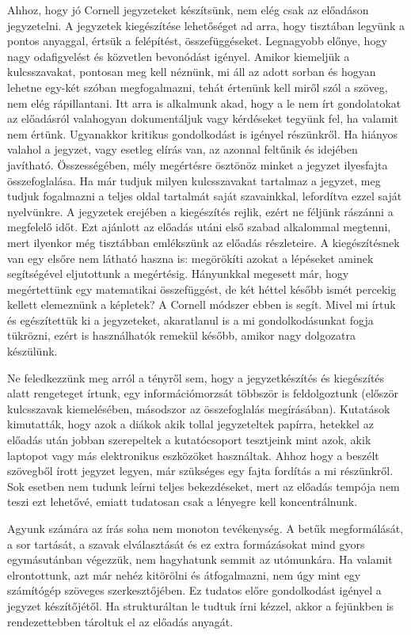 \documentclass[../Main.tex]{subfiles}
\begin{document}
Ahhoz, hogy jó Cornell jegyzeteket készítsünk, nem elég csak az előadáson jegyzetelni.
A jegyzetek kiegészítése lehetőséget ad arra, hogy tisztában legyünk a pontos anyaggal,
értsük a felépítést, összefüggéseket. Legnagyobb előnye, hogy nagy odafigyelést és
közvetlen bevonódást igényel. Amikor kiemeljük a kulcsszavakat, pontosan meg kell
néznünk, mi áll az adott sorban és hogyan lehetne egy-két szóban megfogalmazni, tehát
értenünk kell miről szól a szöveg, nem elég rápillantani. Itt arra is alkalmunk akad, hogy a
le nem írt gondolatokat az előadásról valahogyan dokumentáljuk vagy kérdéseket tegyünk
fel, ha valamit nem értünk. Ugyanakkor kritikus gondolkodást is igényel részünkről. Ha
hiányos valahol a jegyzet, vagy esetleg elírás van, az azonnal feltűnik és idejében
javítható. Összességében, mély megértésre ösztönöz minket a jegyzet ilyesfajta
összefoglalása. Ha már tudjuk milyen kulcsszavakat tartalmaz a jegyzet, meg tudjuk
fogalmazni a teljes oldal tartalmát saját szavainkkal, lefordítva ezzel saját nyelvünkre.
A jegyzetek erejében a kiegészítés rejlik, ezért ne féljünk rászánni a megfelelő időt. Ezt
ajánlott az előadás utáni első szabad alkalommal megtenni, mert ilyenkor még tisztábban
emlékszünk az előadás részleteire. A kiegészítésnek van egy elsőre nem látható haszna is:
megörökíti azokat a lépéseket aminek segítségével eljutottunk a megértésig. Hányunkkal
megesett már, hogy megértettünk egy matematikai összefüggést, de két héttel később
ismét percekig kellett elemeznünk a képletek? A Cornell módszer ebben is segít. Mivel mi
írtuk és egészítettük ki a jegyzeteket, akaratlanul is a mi gondolkodásunkat fogja tükrözni,
ezért is használhatók remekül később, amikor nagy dolgozatra készülünk.



Ne feledkezzünk meg arról a tényről sem, hogy a jegyzetkészítés és kiegészítés alatt
rengeteget írtunk, egy információmorzsát többször is feldolgoztunk (először kulcsszavak
kiemelésében, másodszor az összefoglalás megírásában). Kutatások kimutatták, hogy azok
a diákok akik tollal jegyzeteltek papírra, hetekkel az előadás után jobban szerepeltek a
kutatócsoport tesztjeink mint azok, akik laptopot vagy más elektronikus eszközöket
használtak. Ahhoz hogy a beszélt szövegből írott jegyzet legyen, már szükséges egy fajta
fordítás a mi részünkről. Sok esetben nem tudunk leírni teljes bekezdéseket, mert az
előadás tempója nem teszi ezt lehetővé, emiatt tudatosan csak a lényegre kell
koncentrálnunk.

Agyunk számára az írás soha nem monoton tevékenység. A betűk megformálását, a sor
tartását, a szavak elválasztását és ez extra formázásokat mind gyors egymásutánban
végezzük, nem hagyhatunk semmit az utómunkára. Ha valamit elrontottunk, azt már
nehéz kitörölni és átfogalmazni, nem úgy mint egy számítógép szöveges szerkesztőjében.
Ez tudatos előre gondolkodást igényel a jegyzet készítőjétől. Ha strukturáltan le tudtuk
írni kézzel, akkor a fejünkben is rendezettebben tároltuk el az előadás anyagát.
\end{document}
